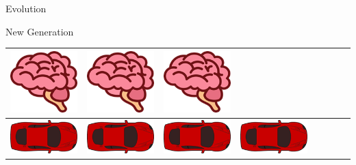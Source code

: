 \documentclass{beamer}
\begin{document}
\begin{frame}{Evolution}
\begin{block}{New Generation}
\begin{tabular}{c|c|c|c|c|c|c|c}
            \includegraphics[scale=0.66]{brain0.png}&
            \includegraphics[scale=0.66]{brain0.png}&
            \includegraphics[scale=0.66]{brain0.png}\\ \hline
            \includegraphics[scale=0.25]{car.png}&
            \includegraphics[scale=0.25]{car.png}&
            \includegraphics[scale=0.25]{car.png}&
            \includegraphics[scale=0.25]{car.png}&

\end{tabular}
\end{block}
\end{frame}
\end{document}

